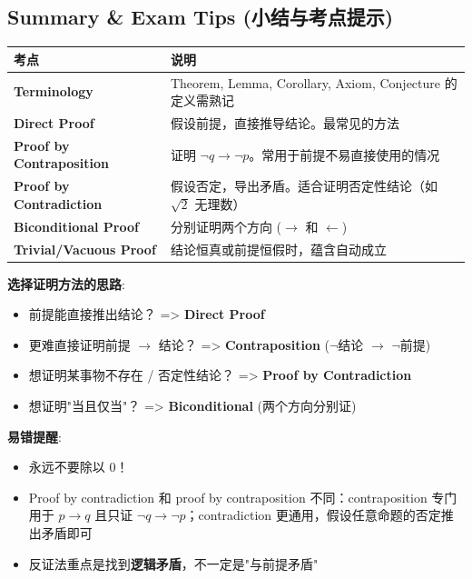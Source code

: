 \documentclass[10pt,a4paper,openany]{ctexbook}
\theoremstyle{definition}
\theoremstyle{remark}
\begin{document}
\subsection{Summary \& Exam Tips (小结与考点提示)}

\begin{center}
\begin{tabular}{ll}
\hline
考点 & 说明 \\ \hline
\textbf{Terminology} & Theorem, Lemma, Corollary, Axiom, Conjecture 的定义需熟记 \\
\textbf{Direct Proof} & 假设前提，直接推导结论。最常见的方法 \\
\textbf{Proof by Contraposition} & 证明 $\neg q \to \neg p$。常用于前提不易直接使用的情况 \\
\textbf{Proof by Contradiction} & 假设否定，导出矛盾。适合证明否定性结论（如 $\sqrt{2}$ 无理数） \\
\textbf{Biconditional Proof} & 分别证明两个方向 ($\to$ 和 $\leftarrow$) \\
\textbf{Trivial/Vacuous Proof} & 结论恒真或前提恒假时，蕴含自动成立 \\
\hline
\end{tabular}

\end{center}

\textbf{选择证明方法的思路}:
\begin{itemize}
\item 前提能直接推出结论？ => \textbf{Direct Proof}
\item 更难直接证明前提 $\to$ 结论？ => \textbf{Contraposition} ($\neg$结论 $\to$ $\neg$前提)
\item 想证明某事物不存在 / 否定性结论？ => \textbf{Proof by Contradiction}
\item 想证明"当且仅当"？ => \textbf{Biconditional} (两个方向分别证)

\end{itemize}

\textbf{易错提醒}:
\begin{itemize}
\item 永远不要除以 0！
\item Proof by contradiction 和 proof by contraposition 不同：contraposition 专门用于 $p \to q$ 且只证 $\neg q \to \neg p$；contradiction 更通用，假设任意命题的否定推出矛盾即可
\item 反证法重点是找到\textbf{逻辑矛盾}，不一定是"与前提矛盾"

\end{itemize}
\end{document}
